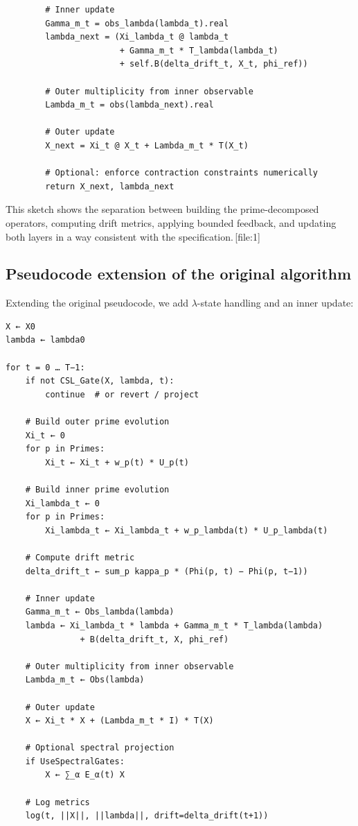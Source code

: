 \documentclass[11pt]{article}
\begin{document}
\begin{verbatim}
        # Inner update
        Gamma_m_t = obs_lambda(lambda_t).real
        lambda_next = (Xi_lambda_t @ lambda_t
                       + Gamma_m_t * T_lambda(lambda_t)
                       + self.B(delta_drift_t, X_t, phi_ref))

        # Outer multiplicity from inner observable
        Lambda_m_t = obs(lambda_next).real

        # Outer update
        X_next = Xi_t @ X_t + Lambda_m_t * T(X_t)

        # Optional: enforce contraction constraints numerically
        return X_next, lambda_next
\end{verbatim}

This sketch shows the separation between building the prime-decomposed operators, computing drift metrics, applying bounded feedback, and updating both layers in a way consistent with the specification.\,[file:1]

\subsection{Pseudocode extension of the original algorithm}

Extending the original pseudocode, we add $\lambda$-state handling and an inner update:

\begin{verbatim}
X ← X0
lambda ← lambda0

for t = 0 … T−1:
    if not CSL_Gate(X, lambda, t):
        continue  # or revert / project

    # Build outer prime evolution
    Xi_t ← 0
    for p in Primes:
        Xi_t ← Xi_t + w_p(t) * U_p(t)

    # Build inner prime evolution
    Xi_lambda_t ← 0
    for p in Primes:
        Xi_lambda_t ← Xi_lambda_t + w_p_lambda(t) * U_p_lambda(t)

    # Compute drift metric
    delta_drift_t ← sum_p kappa_p * (Phi(p, t) − Phi(p, t−1))

    # Inner update
    Gamma_m_t ← Obs_lambda(lambda)
    lambda ← Xi_lambda_t * lambda + Gamma_m_t * T_lambda(lambda)
               + B(delta_drift_t, X, phi_ref)

    # Outer multiplicity from inner observable
    Lambda_m_t ← Obs(lambda)

    # Outer update
    X ← Xi_t * X + (Lambda_m_t * I) * T(X)

    # Optional spectral projection
    if UseSpectralGates:
        X ← ∑_α E_α(t) X

    # Log metrics
    log(t, ||X||, ||lambda||, drift=delta_drift(t+1))
\end{verbatim}
\end{document}
